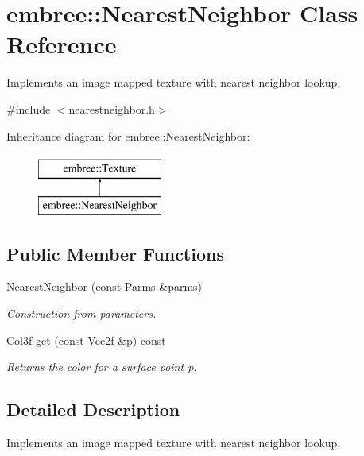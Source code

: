 \hypertarget{classembree_1_1_nearest_neighbor}{
\section{embree::NearestNeighbor Class Reference}
\label{classembree_1_1_nearest_neighbor}
}


Implements an image mapped texture with nearest neighbor lookup.  




{\ttfamily \#include $<$nearestneighbor.h$>$}

Inheritance diagram for embree::NearestNeighbor:\begin{figure}[H]
\begin{center}
\leavevmode
\includegraphics[height=2.000000cm]{classembree_1_1_nearest_neighbor}
\end{center}
\end{figure}
\subsection*{Public Member Functions}
\begin{DoxyCompactItemize}
\item 
\hyperlink{classembree_1_1_nearest_neighbor_a787fdafdd3c8bd259b7b965a36dae633}{NearestNeighbor} (const \hyperlink{classembree_1_1_parms}{Parms} \&parms)
\begin{DoxyCompactList}\small\item\em Construction from parameters. \item\end{DoxyCompactList}\item 
Col3f \hyperlink{classembree_1_1_nearest_neighbor_a8cb7bc5733196269006ba7a1116017f4}{get} (const Vec2f \&p) const 
\begin{DoxyCompactList}\small\item\em Returns the color for a surface point p. \item\end{DoxyCompactList}\end{DoxyCompactItemize}


\subsection{Detailed Description}
Implements an image mapped texture with nearest neighbor lookup. 

